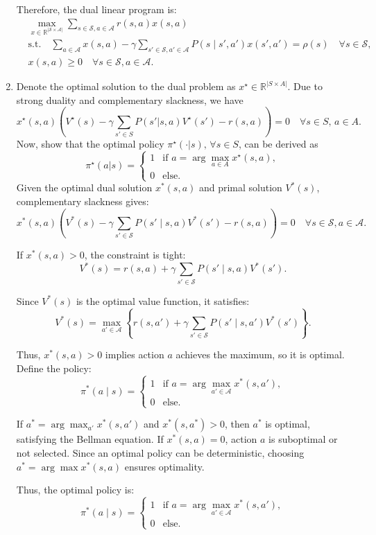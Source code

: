 \documentclass[a3paper,12pt]{extarticle} %
\begin{document}
\begin{enumerate}
Therefore, the dual linear program is:
\[
\begin{aligned}
& \max_{x \in \mathbb{R}^{|\mathcal{S} \times \mathcal{A}|}} \sum_{s \in \mathcal{S}, a \in \mathcal{A}} r(s, a) x(s, a) \\
& \text{s.t.} \quad \sum_{a \in \mathcal{A}} x(s, a) - \gamma \sum_{s' \in \mathcal{S}, a' \in \mathcal{A}} P(s \mid s', a') x(s', a') = \rho(s) \quad \forall s \in \mathcal{S}, \\
& x(s, a) \geq 0 \quad \forall s \in \mathcal{S}, a \in \mathcal{A}.
\end{aligned}
\]
   \item Denote the optimal solution to the dual problem as $x^\star \in \mathbb{R}^{|S \times A|}$. Due to strong duality
    and complementary slackness, we have
    \[
    x^\star(s, a) \left(V^\star(s) - \gamma \sum_{s' \in S} P(s'|s, a)V^\star(s') - r(s, a)\right) = 0 \quad \forall s \in S, \, a \in A.
    \]
    Now, show that the optimal policy $\pi^\star(\cdot|s), \, \forall s \in S$, can be derived as
    \[
    \pi^\star(a|s) =
    \begin{cases}
    1 & \text{if } a = \arg \max_{a \in A} x^\star(s, a), \\
    0 & \text{else}.
    \end{cases}
    \]
    Given the optimal dual solution $x^*(s, a)$ and primal solution $V^*(s)$, complementary slackness gives:
\[
x^*(s, a) \left( V^*(s) - \gamma \sum_{s' \in \mathcal{S}} P(s' \mid s, a) V^*(s') - r(s, a) \right) = 0 \quad \forall s \in \mathcal{S}, a \in \mathcal{A}.
\]

If $x^*(s, a) > 0$, the constraint is tight:
\[
V^*(s) = r(s, a) + \gamma \sum_{s' \in \mathcal{S}} P(s' \mid s, a) V^*(s').
\]

Since $V^*(s)$ is the optimal value function, it satisfies:
\[
V^*(s) = \max_{a' \in \mathcal{A}} \left\{ r(s, a') + \gamma \sum_{s' \in \mathcal{S}} P(s' \mid s, a') V^*(s') \right\}.
\]

Thus, $x^*(s, a) > 0$ implies action $a$ achieves the maximum, so it is optimal. Define the policy:
\[
\pi^*(a \mid s) = \begin{cases} 
1 & \text{if } a = \arg \max_{a' \in \mathcal{A}} x^*(s, a'), \\
0 & \text{else}.
\end{cases}
\]

If $a^* = \arg \max_{a'} x^*(s, a')$ and $x^*(s, a^*) > 0$, then $a^*$ is optimal, satisfying the Bellman equation. If $x^*(s, a) = 0$, action $a$ is suboptimal or not selected. Since an optimal policy can be deterministic, choosing $a^* = \arg \max x^*(s, a)$ ensures optimality.

Thus, the optimal policy is:
\[
\pi^*(a \mid s) = \begin{cases} 
1 & \text{if } a = \arg \max_{a' \in \mathcal{A}} x^*(s, a'), \\
0 & \text{else}.
\end{cases}
\]
\end{enumerate}
\end{document}
